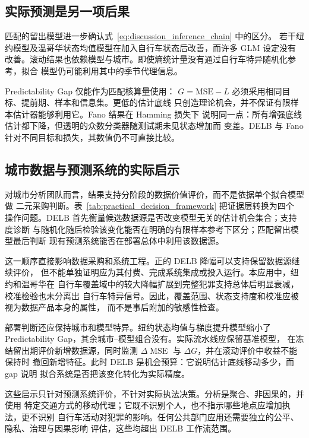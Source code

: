 \subsection{实际预测是另一项后果}
\label{subsec:discussion_prediction}

匹配的留出模型进一步确认式~\eqref{eq:discussion_inference_chain} 中的区分。
若干纽约模型及温哥华状态均值模型在加入自行车状态后改善，而许多 GLM 设定没有
改善。滚动结果也依赖模型与城市。即使熵统计量没有通过自行车特异随机化参考，拟合
模型仍可能利用其中的季节代理信息。

Predictability Gap 仅能作为匹配核算量使用：
\(G=\mathrm{MSE}-L\) 必须采用相同目标、提前期、样本和信息集。更低的估计底线
只创造理论机会，并不保证有限样本估计器能够利用它。Fano 结果在 Hamming 损失下
说明同一点：所有增强底线估计都下降，但透明的众数分类器随测试期未见状态增加而
变差。DELB 与 Fano 针对不同目标和损失，其数值仍不可直接比较。

\subsection{城市数据与预测系统的实际启示}
\label{subsec:practical_implications}

对城市分析团队而言，结果支持分阶段的数据价值评价，而不是依据单个拟合模型做
二元采购判断。表~\ref{tab:practical_decision_framework} 把证据层转换为四个
操作问题。DELB 首先衡量候选数据源是否改变模型无关的估计机会集合；支持度诊断
与随机化随后检验该变化能否在明确的有限样本参考下区分；匹配留出模型最后判断
现有预测系统能否在部署总体中利用该数据源。



这一顺序直接影响数据采购和系统工程。正的 DELB 降幅可以支持保留数据源继续评价，
但不能单独证明应为其付费、完成系统集成或投入运行。本应用中，纽约和温哥华在
自行车覆盖域中的较大降幅扩展到完整犯罪支持总体后明显衰减，校准检验也未分离出
自行车特异信号。因此，覆盖范围、状态支持度和校准应被视为数据产品本身的属性，
而不是事后附加的敏感性检查。

部署判断还应保持城市和模型特异。纽约状态均值与梯度提升模型缩小了
Predictability Gap，其余城市--模型组合没有。实际流水线应保留基准模型，
在冻结留出期评价新增数据源，同时监测
\(\Delta\operatorname{MSE}\) 与 \(\Delta G\)，并在滚动评价中收益不能保持时
撤回新增特征。此时 DELB 是机会预算：它说明估计底线移动多少，而 gap 说明
拟合系统是否把该变化转化为实际精度。

这些启示只针对预测系统评价，不针对实际执法决策。分析是聚合、非因果的，并使用
特定交通方式的移动代理；它既不识别个人，也不指示哪些地点应增加执法，更不识别
自行车活动对犯罪的影响。任何公共部门应用还需要独立的公平、隐私、治理与因果影响
评估，这些均超出 DELB 工作流范围。

